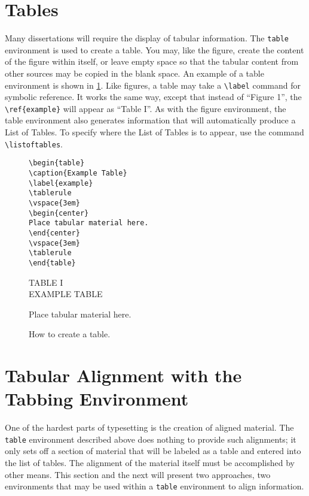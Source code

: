\section{Tables}
Many dissertations will require the display of tabular information.
The \verb+table+ environment is used to create a table.
You may, like the figure, create the content of the figure within
\uicthesi{} itself, or leave empty space so that the tabular content from
other sources may be copied in the blank space.
An example of a table environment is shown in \ref{fig:tab}.
Like figures, a table may take a \verb+\label+ command for symbolic
reference.
It works the same way, except that instead of ``Figure 1'', the
\verb+\ref{example}+ will appear as ``Table I''.
As with the figure environment, the table environment also generates
information that will automatically produce a List of Tables.
To specify where the List of Tables is to appear, use the command
\verb+\listoftables+.
\begin{figure}
\footnotesize
\begin{minipage}[t]{0.48\textwidth}
\begin{verbatim}
\begin{table}
\caption{Example Table}
\label{example}
\tablerule
\vspace{3em}
\begin{center}
Place tabular material here.
\end{center}
\vspace{3em}
\tablerule
\end{table}
\end{verbatim}
\end{minipage}\hfill
\begin{minipage}[t]{0.48\textwidth}
\begin{center}
TABLE I\\EXAMPLE TABLE
\end{center}
\tablerule
\vspace{3em}
\begin{center}
Place tabular material here.
\end{center}
\vspace{3em}
\tablerule
\end{minipage}
\vspace{1em}
\caption{How to create a table.}
\label{fig:tab}
\end{figure}
 
\section{Tabular Alignment with the Tabbing Environment}
One of the hardest parts of typesetting is the creation of aligned
material.
The \verb+table+ environment described above does nothing to
provide such alignments; it only sets off a section of material
that will be labeled as a table and entered into the list of tables.
The alignment of the material itself must be accomplished by other
means.
This section and the next will present two approaches, two environments
that may be used within a \verb+table+ environment to align information.
 
